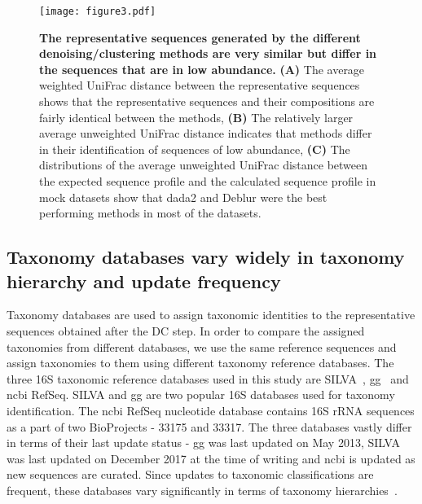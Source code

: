   \begin{figure}
    \centering
    \texttt{[image: figure3.pdf]}
    \caption{
      \textbf{The representative sequences generated by the different denoising/clustering methods are very similar but differ in the sequences that are in low abundance.}
      \textbf{(A)} The average weighted UniFrac distance between the representative sequences shows that the representative sequences and their compositions are fairly identical between the methods,
      \textbf{(B)} The relatively larger average unweighted UniFrac distance indicates that methods differ in their identification of sequences of low abundance,
      \textbf{(C)} The distributions of the average unweighted UniFrac distance between the expected sequence profile and the calculated sequence profile in mock datasets show that dada2 and Deblur were the best performing methods in most of the datasets.
    }
    \label{fig:figure3}
  \end{figure}

  \FloatBarrier

  \subsection*{Taxonomy databases vary widely in taxonomy hierarchy and update frequency}

  Taxonomy databases are used to assign taxonomic identities to the representative sequences obtained after the DC step.
  In order to compare the assigned taxonomies from different databases, we use the same reference sequences and assign taxonomies to them using different taxonomy reference databases.
  The three 16S taxonomic reference databases used in this study are SILVA~\cite{Quast2012}, \ac{gg}~\cite{DeSantis2006} and \ac{ncbi} RefSeq.
  SILVA and \ac{gg} are two popular 16S databases used for taxonomy identification.
  The \ac{ncbi} RefSeq nucleotide database contains 16S rRNA sequences as a part of two BioProjects - 33175 and 33317.
  The three databases vastly differ in terms of their last update status - \ac{gg} was last updated on May 2013, SILVA was last updated on December 2017 at the time of writing and \ac{ncbi} is updated as new sequences are curated.
  Since updates to taxonomic classifications are frequent, these databases vary significantly in terms of taxonomy hierarchies~\cite{Balvociute2017}.

